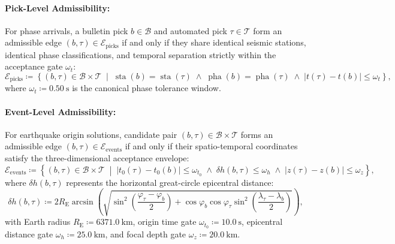 \paragraph{Pick-Level Admissibility:}
For phase arrivals, a bulletin pick $b \in \mathcal{B}$ and automated pick
$\tau \in \mathcal{T}$ form an admissible edge $(b, \tau) \in
\mathcal{E}_{\mathrm{picks}}$
if and only if they share identical seismic stations, identical
phase classifications,
and temporal separation strictly within the acceptance gate $\omega_t$:
\begin{equation}
  \mathcal{E}_{\mathrm{picks}} \coloneqq \left\{(b, \tau) \in
    \mathcal{B} \times \mathcal{T}
    \;\middle|\;
    \operatorname{sta}(b) = \operatorname{sta}(\tau) \;\land\;
    \operatorname{pha}(b) = \operatorname{pha}(\tau) \;\land\;
  |t(\tau) - t(b)| \le \omega_t \right\},
  \label{eq:supp_pick_admissibility}
\end{equation}
where $\omega_t \coloneqq \qty{0.50}{\second}$ is the canonical
phase tolerance window.

\paragraph{Event-Level Admissibility:}
For earthquake origin solutions, candidate pair $(b, \tau) \in
\mathcal{B} \times \mathcal{T}$
forms an admissible edge $(b, \tau) \in
\mathcal{E}_{\mathrm{events}}$ if and only if
their spatio-temporal coordinates satisfy the three-dimensional
acceptance envelope:
\begin{equation}
  \mathcal{E}_{\mathrm{events}} \coloneqq \left\{(b, \tau) \in
    \mathcal{B} \times \mathcal{T}
    \;\middle|\;
    |t_0(\tau) - t_0(b)| \le \omega_{t_0} \;\land\;
    \delta h(b, \tau) \le \omega_h \;\land\;
  |z(\tau) - z(b)| \le \omega_z \right\},
  \label{eq:supp_event_admissibility}
\end{equation}
where $\delta h(b, \tau)$ represents the horizontal great-circle
epicentral distance:
\begin{equation}
  \delta h(b, \tau) \coloneqq 2 R_{\mathrm{E}} \arcsin \left(
    \sqrt{\sin^2\left(\frac{\varphi_{\tau} - \varphi_b}{2}\right) +
      \cos\varphi_b \cos\varphi_{\tau}
    \sin^2\left(\frac{\lambda_{\tau} - \lambda_b}{2}\right)}
  \right),
  \label{eq:supp_haversine}
\end{equation}
with Earth radius $R_{\mathrm{E}} \coloneqq
\qty{6371.0}{\kilo\metre}$, origin time
gate $\omega_{t_0} \coloneqq \qty{10.0}{\second}$, epicentral distance gate
$\omega_h \coloneqq \qty{25.0}{\kilo\metre}$, and focal depth gate
$\omega_z \coloneqq \qty{20.0}{\kilo\metre}$.

